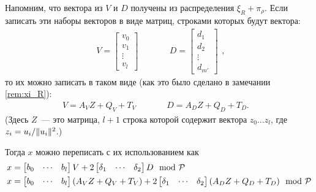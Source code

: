 \documentclass[oneside, a4paper]{article}
\theoremstyle{plain}
\theoremstyle{definition}
\theoremstyle{remark}
\newcommand\PP{\ensuremath \mathcal P}
\DeclarePairedDelimiter\norm{\lVert}{\rVert}
\begin{document}
Напомним, что вектора из $V$ и $D$ получены из распределения $\xi_R + \pi_\rho$.
Если записать эти наборы векторов в виде матриц, строками которых будут вектора:
\[
\begin{aligned}
  V = \begin{bmatrix}
    v_0 \\
    v_1 \\
    \vdots \\
    v_l
  \end{bmatrix}
  &
  \quad\quad
  &
  D = \begin{bmatrix}
    d_1 \\
    d_2 \\
    \vdots \\
    d_{m'}
  \end{bmatrix}
\end{aligned},
\]
то их можно записать в таком виде (как это было сделано в замечании
\ref{rem:xi_R}):
\[
\begin{aligned}
  V = A_V Z + Q_V + T_V &
  \quad\quad &
  D = A_D Z + Q_D + T_D. &
\end{aligned}
\]
(Здесь $Z$~--- это матрица, $l+1$ строка которой содержит вектора $z_0 \dots
z_l$, где $z_i = u_i / \norm{u_i}^2$.)

Тогда $x$ можно переписать с их использованием как
\[
\begin{aligned}
x &= \begin{bmatrix} b_0 & \cdots & b_l \end{bmatrix} V
  + 2 \begin{bmatrix} \delta_1 & \cdots & \delta_2 \end{bmatrix} D
  \mod \PP \\
x &= \begin{bmatrix} b_0 & \cdots & b_l \end{bmatrix} (A_V Z + Q_V + T_V)
  + 2 \begin{bmatrix} \delta_1 & \cdots & \delta_2 \end{bmatrix}
      (A_D Z + Q_D + T_D)
  \mod \PP
\end{aligned}
\]
\end{document}

